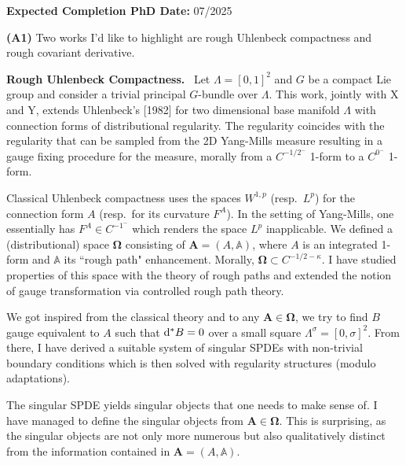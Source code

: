 \documentclass[./Research_statement.tex]{subfiles}
\newcommand{\bfOmega}{\boldsymbol{\Omega}}
\newcommand{\bA}{\mathbb A}
\newcommand{\bfA}{\mathbf{A}}
\begin{document}
\vspace*{-2cm}
\noindent \textbf{Expected Completion PhD Date:} 07/2025
\vspace{0.75cm}
\medskip 

\noindent \textbf{(A1)} Two works I’d like to highlight are rough Uhlenbeck compactness and rough covariant derivative.

\vspace{2pt}

\noindent \textbf{Rough Uhlenbeck Compactness.}\ 
%
Let $\Lambda=[0,1]^2$ and $G$ be a compact Lie group and consider a trivial principal $G$-bundle over $\Lambda$.  
This work, jointly with X and Y, extends Uhlenbeck's [1982] for two dimensional base manifold $\Lambda$ with connection forms of distributional regularity. The regularity coincides with the regularity that can be sampled from the 2D Yang-Mills measure resulting in a gauge fixing procedure for the measure, morally from a $C^{-1/2^-}$ 1-form to a $C^{0^-}$ 1-form.  


Classical Uhlenbeck compactness uses the spaces $W^{1,p}$ (resp.\ $L^p$) for the connection form $A$ (resp.\ for its curvature $F^A$). In the setting of Yang-Mills, one essentially has $F^A\in C^{-1^-}$ which renders the space $L^p$ inapplicable. We defined a (distributional) space $\bfOmega$ consisting of $\bfA=(A,\bA)$, where $A$ is an integrated 1-form and  $\bA$ its ``rough path" enhancement. Morally, $\bfOmega\subset C^{-1/2-\kappa}$.  I have studied properties of this space with the theory of rough paths and extended the notion of gauge transformation via controlled rough path theory. 

We got inspired from the classical theory and to any $\bfA\in\bfOmega$,  we try to find $B$ gauge equivalent to $A$ such that $\mathrm{d}^*B=0$ over a small square $\Lambda^\sigma=[0,\sigma]^2$. From there, I have derived a suitable system of singular SPDEs with non-trivial boundary conditions which is then solved with regularity structures (modulo adaptations). 


The singular SPDE yields singular objects 
that one needs to make sense of. I have managed to define the singular objects from $\bfA\in\bfOmega$. This is surprising, as the singular objects are not only more numerous but also qualitatively distinct from the information contained in $\bfA=(A,\bA)$.
\end{document}
